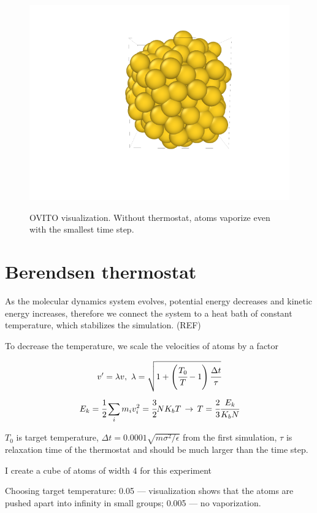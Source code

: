 \documentclass[11pt,a4paper]{article}
\newcommand{\infers}{\,\to\,}
\begin{document}
\begin{figure}[htb]
\begin{minipage}{.3\textwidth}
{			\includegraphics[trim={1.8cm 1.8cm 2.2cm 1cm},clip]{img/sim3.png}}
	\end{minipage}
	\caption{OVITO visualization. Without thermostat, atoms vaporize even with the smallest time step.}
	\label{fig:first_simulation_ovito}
\end{figure}




\section*{Berendsen thermostat}
As the molecular dynamics system evolves, potential energy decreases and kinetic energy increases, therefore we connect the system to a heat bath of constant temperature, which stabilizes the simulation. (REF)

To decrease the temperature, we scale the velocities of atoms by a factor

\[ v' = \lambda v,\ \lambda = \sqrt{1 + \left(\cfrac{T_0}{T}-1 \right) \cfrac{\Delta t}{\tau} }  \]
\[ E_k = \cfrac{1}{2} \sum_i m_i v_i^2 = \cfrac{3}{2} N K_b T \infers T = \cfrac{2}{3} \cfrac{E_k}{K_b N} \]

\(T_0\) is target temperature, \(\Delta t = 0.0001 \sqrt{m\sigma^2 / \epsilon} \) from the first simulation, \( \tau \) is relaxation time of the thermostat and should be much larger than the time step.

I create a cube of atoms of width 4 for this experiment

Choosing target temperature: 0.05 --- visualization shows that the atoms are pushed apart into infinity in small groups; 0.005 --- no vaporization.
\end{document}

